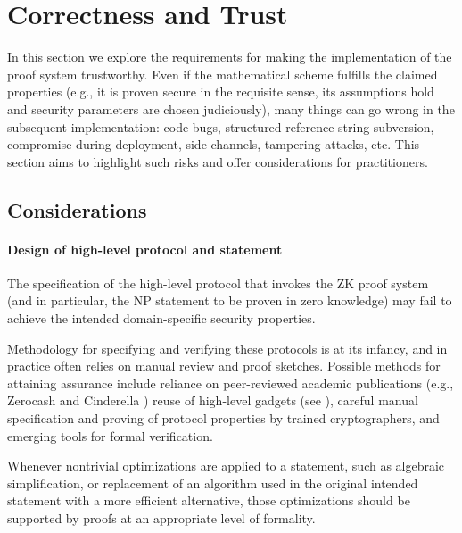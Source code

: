 \section{Correctness and Trust}
\label{implem:correctness}

In this section we explore the requirements for making the implementation of the proof system trustworthy.
Even if the mathematical scheme fulfills the claimed properties (e.g., it is proven secure in the requisite sense, its assumptions hold and security parameters are chosen judiciously), many things can go wrong in the subsequent implementation: code bugs, structured reference string subversion, compromise during deployment, side channels, tampering attacks, etc.
This section aims to highlight such risks and offer considerations for practitioners.

\subsection{Considerations}
\label{implem:correctness:considerations}


\paragraph{Design of high-level protocol and statement}
The specification of the high-level protocol that invokes the ZK proof system (and in particular, the NP statement to be proven in zero knowledge) may fail to achieve the intended domain-specific security properties.

Methodology for specifying and verifying these protocols is at its infancy, and in practice often relies on manual review and proof sketches. 
Possible methods for attaining assurance include reliance on peer-reviewed academic publications (e.g., Zerocash \cite{2014:BCGGMTV:SP:Zerocash} and Cinderella \cite{2016:SP:cinderella}) reuse of high-level gadgets (see ), careful manual specification and proving of protocol properties by trained cryptographers, and emerging tools for formal verification.

Whenever nontrivial optimizations are applied to a statement, such as algebraic simplification, or replacement of an algorithm used in the original intended statement with a more efficient alternative, those optimizations should be supported by proofs at an appropriate level of formality.


